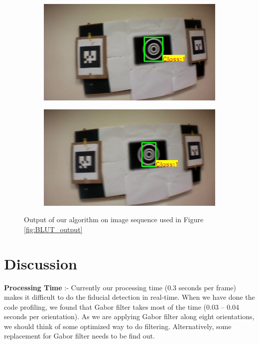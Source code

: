\documentclass[runningheads]{llncs}
\begin{document}
\begin{figure}
\begin{subfigure}[b]{.19\textwidth}
\end{subfigure}
\begin{subfigure}[b]{.19\textwidth}
\includegraphics[width=\linewidth]{output14.jpg}
\end{subfigure}
\begin{subfigure}[b]{.19\textwidth}
\includegraphics[width=\linewidth]{output15.jpg}
\end{subfigure}
\caption{Output of our algorithm on image sequence used in
Figure \ref{fig:BLUT_output}}
\label{fig:our_output}
\end{figure}

\section{Discussion}

\textbf{Processing Time} :-  Currently our processing time (0.3 seconds per
frame) makes it difficult to do the fiducial detection in real-time. When we have
done the code profiling, we found that Gabor filter takes most of the time (0.03
-- 0.04 seconds per orientation). As we are applying Gabor filter along eight
orientations, we should think of some optimized way to do filtering.
Alternatively, some replacement for Gabor filter needs to be find out.  
\end{document}
